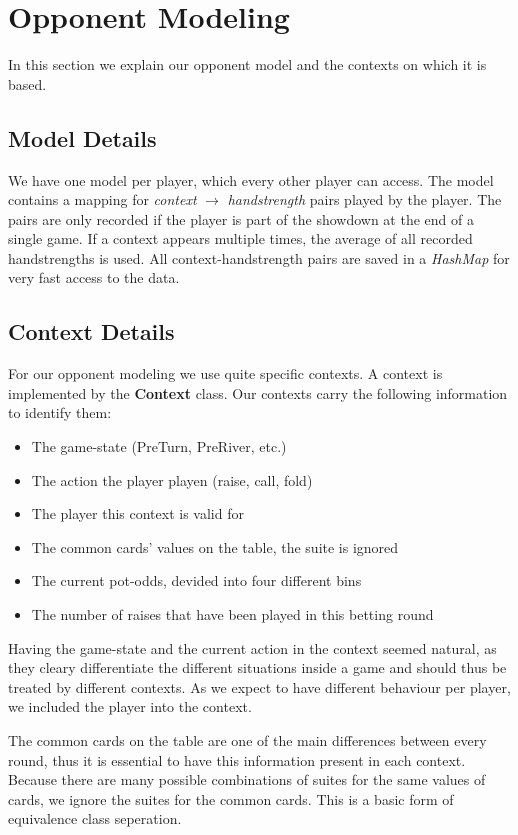 \pagebreak
\section{Opponent Modeling}
In this section we explain our opponent model and the contexts on which it is based.

\subsection{Model Details}
We have one model per player, which every other player can access. The model contains a mapping for \textit{context}
$ \rightarrow $ \textit{handstrength} pairs played by the player. The pairs are only recorded if the player is part of the showdown at
the end of a single game. If a context appears multiple times, the average of all recorded handstrengths is used. All
context-handstrength pairs are saved in a \textit{HashMap} for very fast access to the data.

\subsection{Context Details}
For our opponent modeling we use quite specific contexts. A context is implemented by the \textbf{Context} class.
Our contexts carry the following information to identify them:
\begin{itemize}
    \item The game-state (PreTurn, PreRiver, etc.)
    \item The action the player playen (raise, call, fold)
    \item The player this context is valid for
    \item The common cards' values on the table, the suite is ignored
    \item The current pot-odds, devided into four different bins
    \item The number of raises that have been played in this betting round
\end{itemize}
Having the game-state and the current action in the context seemed natural, as they cleary differentiate the different
situations inside a game and should thus be treated by different contexts. As we expect to have different behaviour per
player, we included the player into the context.

The common cards on the table are one of the main differences between every round, thus it is essential to have this
information present in each context. Because there are many possible combinations of suites for the same values of
cards, we ignore the suites for the common cards. This is a basic form of equivalence class seperation.

